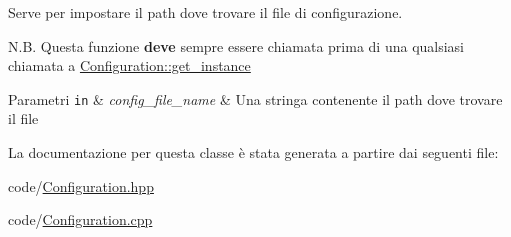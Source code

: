Serve per impostare il path dove trovare il file di configurazione. 

N.\+B. Questa funzione {\bfseries deve} sempre essere chiamata prima di una qualsiasi chiamata a \hyperlink{classmm_1_1_configuration_a5cfc5ea56062f53ef9fbd274f6dbe79e}{Configuration\+::get\+\_\+instance}


\begin{DoxyParams}[1]{Parametri}
\mbox{\tt in}  & {\em config\+\_\+file\+\_\+name} & Una stringa contenente il path dove trovare il file \\
\hline
\end{DoxyParams}


La documentazione per questa classe è stata generata a partire dai seguenti file\+:\begin{DoxyCompactItemize}
\item 
code/\hyperlink{_configuration_8hpp}{Configuration.\+hpp}\item 
code/\hyperlink{_configuration_8cpp}{Configuration.\+cpp}\end{DoxyCompactItemize}
